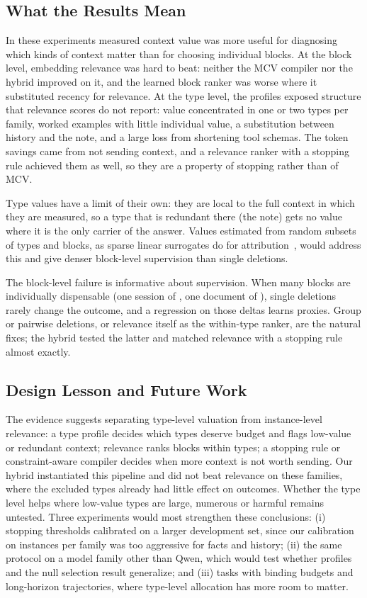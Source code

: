 \subsection{What the Results Mean}
In these experiments measured context value was more useful for diagnosing which kinds of context matter than for
choosing individual blocks. At the block level, embedding relevance was hard to beat: neither the MCV compiler nor the
hybrid improved on it, and the learned block ranker was worse where it substituted recency for relevance. At the type
level, the profiles exposed structure that relevance scores do not report: value concentrated in one or two types per
family, worked examples with little individual value, a substitution between history and the note, and a large loss
from shortening tool schemas. The token savings came from not sending context, and a relevance ranker with a stopping
rule achieved them as well, so they are a property of stopping rather than of MCV.

Type values have a limit of their own: they are local to the full context in which they are measured, so a type that is
redundant there (the note) gets no value where it is the only carrier of the answer. Values estimated from random subsets
of types and blocks, as sparse linear surrogates do for attribution~\citep{contextcite2024}, would address this and give
denser block-level supervision than single deletions.

The block-level failure is informative about supervision. When many blocks are individually dispensable (one session of
\RNumSessions, one document of \RNumDocs), single deletions rarely change the outcome, and a regression on those deltas
learns proxies. Group or pairwise deletions, or relevance itself as the within-type ranker, are the natural fixes; the
hybrid tested the latter and matched relevance with a stopping rule almost exactly.

\subsection{Design Lesson and Future Work}
The evidence suggests separating type-level valuation from instance-level relevance: a type profile decides which
types deserve budget and flags low-value or redundant context; relevance ranks blocks within types; a stopping rule or
constraint-aware compiler decides when more context is not worth sending. Our hybrid instantiated this pipeline and did
not beat relevance on these families, where the excluded types already had little effect on outcomes. Whether the type
level helps where low-value types are large, numerous or harmful remains untested. Three experiments would most
strengthen these conclusions: (i) stopping thresholds calibrated on a larger development set, since our calibration on
\RNCalib instances per family was too aggressive for facts and history; (ii) the same protocol on a model family other
than Qwen, which would test whether profiles and the null selection result generalize; and (iii) tasks with binding
budgets and long-horizon trajectories, where type-level allocation has more room to matter.

